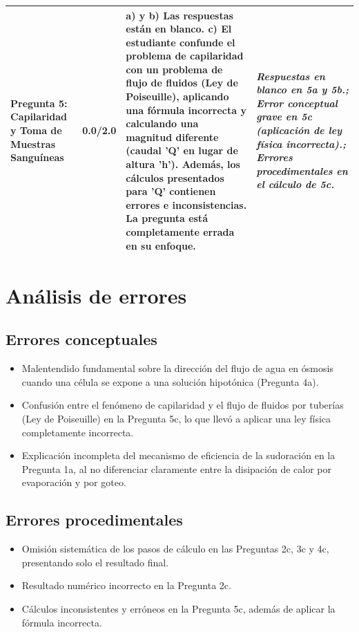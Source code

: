 \documentclass[11pt,a4paper]{article}
\begin{document}
\begin{longtable}{>{\bfseries}p{2.8cm} p{1.6cm} p{7.0cm} p{2.8cm}}
    \midrule
    \textbf{Pregunta 5: Capilaridad y Toma de Muestras Sanguíneas} & 0.0/2.0 & a) y b) Las respuestas están en blanco. c) El estudiante confunde el problema de capilaridad con un problema de flujo de fluidos (Ley de Poiseuille), aplicando una fórmula incorrecta y calculando una magnitud diferente (caudal 'Q' en lugar de altura 'h'). Además, los cálculos presentados para 'Q' contienen errores e inconsistencias. La pregunta está completamente errada en su enfoque. & \textit{Respuestas en blanco en 5a y 5b.; Error conceptual grave en 5c (aplicación de ley física incorrecta).; Errores procedimentales en el cálculo de 5c.} \\
    \midrule
\end{longtable}

\section*{Análisis de errores}

\subsection*{Errores conceptuales}
\begin{itemize}[leftmargin=1.5em, itemsep=2pt]
  \item Malentendido fundamental sobre la dirección del flujo de agua en ósmosis cuando una célula se expone a una solución hipotónica (Pregunta 4a).
  \item Confusión entre el fenómeno de capilaridad y el flujo de fluidos por tuberías (Ley de Poiseuille) en la Pregunta 5c, lo que llevó a aplicar una ley física completamente incorrecta.
  \item Explicación incompleta del mecanismo de eficiencia de la sudoración en la Pregunta 1a, al no diferenciar claramente entre la disipación de calor por evaporación y por goteo.
\end{itemize}

\subsection*{Errores procedimentales}
\begin{itemize}[leftmargin=1.5em, itemsep=2pt]
  \item Omisión sistemática de los pasos de cálculo en las Preguntas 2c, 3c y 4c, presentando solo el resultado final.
  \item Resultado numérico incorrecto en la Pregunta 2c.
  \item Cálculos inconsistentes y erróneos en la Pregunta 5c, además de aplicar la fórmula incorrecta.
\end{itemize}
\end{document}
